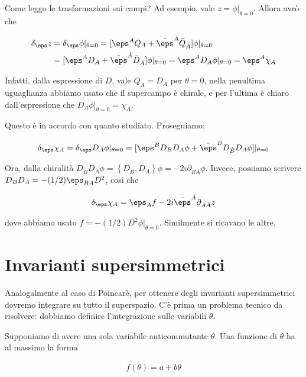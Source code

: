 \documentclass{report}
\begin{document}
Come leggo le trasformazioni sui campi? Ad esempio, vale \(z = \phi|_{\theta = 0}\). Allora avrò che

\begin{align}
    \delta_\eps z &= \delta_\eps \phi |_{\theta = 0} = [\eps^A Q_A + \bar{\eps}^{\dot{A}}\bar{Q}_{\dot{A}}]\phi |_{\theta = 0} \notag \\ 
    &= [\eps^A D_A + \bar{\eps}^{\dot{A}}\bar{D}_{\dot{A}}]\phi |_{\theta =0} = \eps^A D_A \phi |_{\theta = 0} = \eps^A \chi_A
\end{align}

Infatti, dalla espressione di \(D\), vale \(Q_A = D_A\) per \(\theta =0\), nella penultima uguaglianza abbiamo usato che il supercampo è chirale, e per l'ultima è chiaro dall'espressione che \(D_A \phi |_{\theta = 0} = \chi_A\). 

Questo è in accordo con quanto studiato. Proseguiamo: 

\begin{align}
    \delta_\eps \chi_A = \delta_\eps D_A \phi |_{\theta = 0} = [\eps^B D_B D_A \phi + \bar{\eps}^{\dot{B}}D_{\dot{B}}D_A \phi] |_{\theta = 0} 
\end{align}

Ora, dalla chiralità \(D_{\dot{B}}D_A\phi = \left\{ D_{\dot{B}}, D_A \right\}\phi = -2i\partial_{\dot{B}A}\phi\). Invece, possiamo scrivere \(D_B D_A = -(1/2)\eps_{BA}D^2\), così che 

\begin{align}
    \delta_\eps \chi_A = \eps_A f - 2i\bar{\eps}^{\dot{A}}\partial_{A\dot{A}}z
\end{align}

dove abbiamo usato \(f = -(1/2)D^2\phi|_{\theta = 0}\). Similmente si ricavano le altre. 

\section{Invarianti supersimmetrici}

Analogalmente al caso di Poincarè, per ottenere degli invarianti supersimmetrici dovremo integrare su tutto il superspazio. C'è prima un problema tecnico da risolvere: dobbiamo definire l'integrazione sulle variabili \(\theta\). 

Supponiamo di avere una sola variabile anticommutante \(\theta\). Una funzione di \(\theta\) ha al massimo la forma 

\begin{align}
    f(\theta) = a + b\theta
\end{align}
\end{document}
